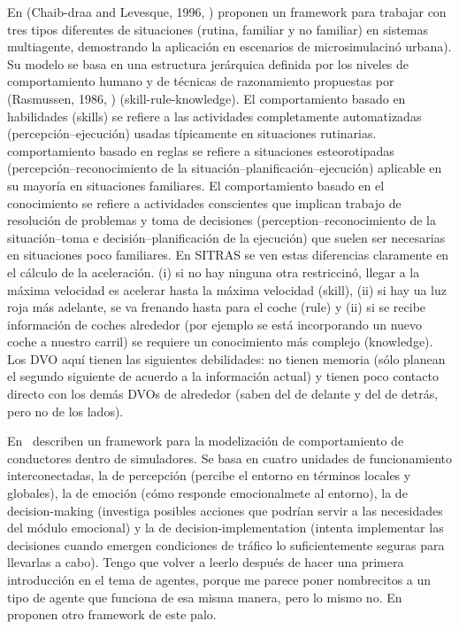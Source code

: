 En (Chaib-draa and Levesque, 1996, ) proponen un framework para trabajar con tres tipos diferentes de situaciones (rutina, familiar y no familiar) en sistemas multiagente, demostrando la aplicación en escenarios de microsimulacinó urbana). Su modelo se basa en una estructura jerárquica definida por los niveles de comportamiento humano y de técnicas de razonamiento propuestas por (Rasmussen, 1986, ) (skill-rule-knowledge). El comportamiento basado en habilidades (skills) se refiere a las actividades completamente automatizadas (percepción--ejecución) usadas típicamente en situaciones rutinarias. comportamiento basado en reglas se refiere a situaciones esteorotipadas (percepción--reconocimiento de la situación--planificación--ejecución) aplicable en su mayoría en situaciones familiares. El comportamiento basado en el conocimiento se refiere a actividades conscientes que implican trabajo de resolución de problemas y toma de decisiones (perception--reconocimiento de la situación--toma e decisión--planificación de la ejecución) que suelen ser necesarias en situaciones poco familiares. En SITRAS se ven estas diferencias claramente en el cálculo de la aceleración. (i) si no hay ninguna otra restriccinó, llegar a la máxima velocidad es acelerar hasta la máxima velocidad (skill), (ii) si hay ua luz roja más adelante, se va frenando hasta para el coche (rule) y (ii) si se recibe información de coches alrededor (por ejemplo se está incorporando un nuevo coche a nuestro carril) se requiere un conocimiento más complejo (knowledge). Los DVO aquí tienen las siguientes debilidades: no tienen memoria (sólo planean el segundo siguiente de acuerdo a la información actual) y tienen poco contacto directo con los demás DVOs de alrededor (saben del de delante y del de detrás, pero no de los lados).

En~\cite{al2001framework} describen un framework para la modelización de comportamiento de conductores dentro de simuladores. Se basa en cuatro unidades de funcionamiento interconectadas, la de percepción (percibe el entorno en términos locales y globales), la de emoción (cómo responde emocionalmete al entorno), la de decision-making (investiga posibles acciones que podrían servir a las necesidades del módulo emocional) y la de decision-implementation (intenta implementar las decisiones cuando emergen condiciones de tráfico lo suficientemente seguras para llevarlas a cabo). Tengo que volver a leerlo después de hacer una primera introducción en el tema de agentes, porque me parece poner nombrecitos a un tipo de agente que funciona de esa misma manera, pero lo mismo no. En \cite{Kuge2000} proponen otro framework de este palo.


